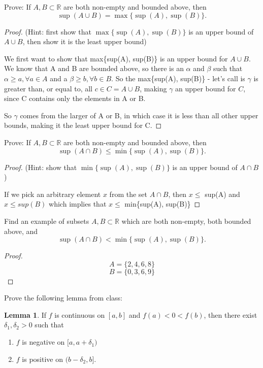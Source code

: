 \documentclass{article} %
\theoremstyle{plain}
\theoremstyle{definition}
\newtheorem*{lemma*}{Lemma}
\newcommand{\Rb}{\mathbb{R}}
\begin{document}
\newpage
\noindent{} Prove: If $A,B \subset \Rb$ are both non-empty and bounded above, then 
$$
\sup(A \cup B) = \max\{\sup(A), \sup(B)\}.
$$


\begin{proof} (Hint: first show that $ \max\{\sup(A), \sup(B)\}$ is an upper bound of $A \cup B$, then show it is the least upper bound)

  We first want to show that max\{sup(A), sup(B)\} is an upper bound for
  $A \cup B$.  We know that A and B are bounded above, so there is an 
  $\alpha$ and $\beta$ such that $\alpha \geq a, \forall a \in A$
  and a $\beta \geq b, \forall b \in B$.  So the max\{sup(A), sup(B)\} -
  let's call is $\gamma$ is greater than, or equal to, all $c \in C =
  A \cup B$, 
  making $\gamma$ an upper bound for $C$, since C contains only the
  elements in A or B.

  So $\gamma$ comes from the larger of A or B, in which case
  it is less than all other upper bounds, making it the least upper bound
  for C.
\end{proof} 

\newpage
\noindent{} Prove: If $A,B \subset \Rb$ are both non-empty and bounded above, then 
$$
\sup(A \cap B) \leq \min\{\sup(A), \sup(B)\}.
$$


\begin{proof} (Hint: show that $\min\{\sup(A), \sup(B)\}$ is an upper bound of $A \cap B$) 

  If we pick an arbitrary element $x$ from the set $A \cap B$, then
  $x \leq $ sup(A) and $x \leq sup(B)$ which implies that
  $x \leq $ min\{sup(A), sup(B)\}
\end{proof} 

\newpage
\noindent{} Find an example of subsets $A,B \subset \Rb$ which are both non-empty, both bounded above, and 
\[ \sup(A \cap B) < \min\{\sup(A), \sup(B)\}. \]

\begin{proof} 
  \[ A = \{ 2, 4, 6, 8\} \]
  \[ B = \{ 0, 3, 6, 9\} \]
\end{proof}



\newpage
\noindent{} Prove the following lemma from class:

\begin{lemma*} If $f$ is continuous on $[a,b]$ and $f(a) < 0 < f(b)$, then there exist $\delta_1, \delta_2 > 0$ such that 
	\begin{enumerate}
		\item $f$ is negative on $[a,a+\delta_1)$
		\item $f$ is positive on $(b-\delta_2, b]$.
	\end{enumerate}
\end{lemma*}
\end{document}
